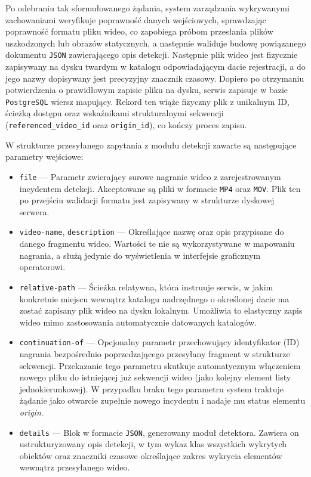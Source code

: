 Po odebraniu tak sformułowanego żądania, system zarządzania wykrywanymi zachowaniami 
weryfikuje poprawność danych wejściowych, sprawdzając poprawność formatu pliku wideo, 
co zapobiega próbom przesłania plików uszkodzonych lub obrazów statycznych, 
a następnie waliduje budowę powiązanego dokumentu \texttt{JSON} zawierającego opis detekcji. 
Następnie plik wideo jest fizycznie zapisywany na dysku twardym w katalogu odpowiadającym dacie rejestracji, 
a do jego nazwy dopisywany jest precyzyjny znacznik czasowy. Dopiero po otrzymaniu potwierdzenia 
o prawidłowym zapisie pliku na dysku, serwis zapisuje w bazie \texttt{PostgreSQL} wiersz mapujący. 
Rekord ten wiąże fizyczny plik z unikalnym ID, ścieżką dostępu oraz wskaźnikami strukturalnymi 
sekwencji (\texttt{referenced\_video\_id} oraz \texttt{origin\_id}), co kończy proces zapisu.

W strukturze przesyłanego zapytania z modułu detekcji zawarte są następujące parametry wejściowe:
\begin{itemize}
    \item \texttt{file} --- Parametr zwierający surowe nagranie wideo z zarejestrowanym incydentem detekcji. Akceptowane są pliki w formacie \texttt{MP4} oraz \texttt{MOV}. Plik ten po przejściu walidacji formatu jest zapisywany w strukturze dyskowej serwera.
    \item \texttt{video-name}, \texttt{description} --- Określające nazwę oraz opis przypisane do danego fragmentu wideo. Wartości te nie są wykorzystywane w mapowaniu nagrania, a służą jedynie do wyświetlenia w interfejsie graficznym operatorowi.
    \item \texttt{relative-path} --- Ścieżka relatywna, która instruuje serwis, w jakim konkretnie miejscu wewnątrz katalogu nadrzędnego o określonej dacie ma zostać zapisany plik wideo na dysku lokalnym. Umożliwia to elastyczny zapis wideo mimo zastosowania automatycznie datowanych katalogów.
    \item \texttt{continuation-of} --- Opcjonalny parametr przechowujący identyfikator (ID) nagrania bezpośrednio poprzedzającego przesyłany fragment w strukturze sekwencji. Przekazanie tego parametru skutkuje automatycznym włączeniem nowego pliku do istniejącej już sekwencji wideo (jako kolejny element listy jednokierunkowej). W przypadku braku tego parametru system traktuje żądanie jako otwarcie zupełnie nowego incydentu i nadaje mu status elementu \textit{origin}.
    \item \texttt{details} --- Blok w formacie \texttt{JSON}, generowany moduł detektora. Zawiera on ustrukturyzowany opis detekcji, w tym wykaz klas wszystkich wykrytych obiektów oraz znaczniki czasowe określające zakres wykrycia elementów wewnątrz przesyłanego wideo.
\end{itemize}

